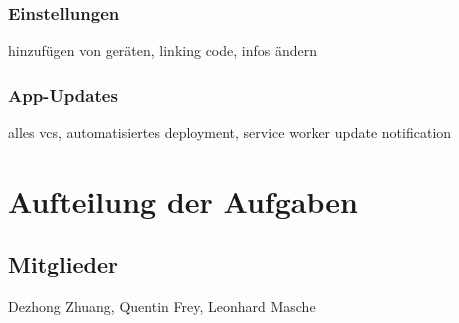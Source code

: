 \documentclass[a4paper]{article}
\begin{document}
\subsubsection{Einstellungen}
hinzufügen von geräten, linking code, infos ändern

\subsubsection{App-Updates}
alles vcs, automatisiertes deployment, service worker update notification




\section{Aufteilung der Aufgaben}

\subsection{Mitglieder}
Dezhong Zhuang, Quentin Frey, Leonhard Masche
\end{document}
